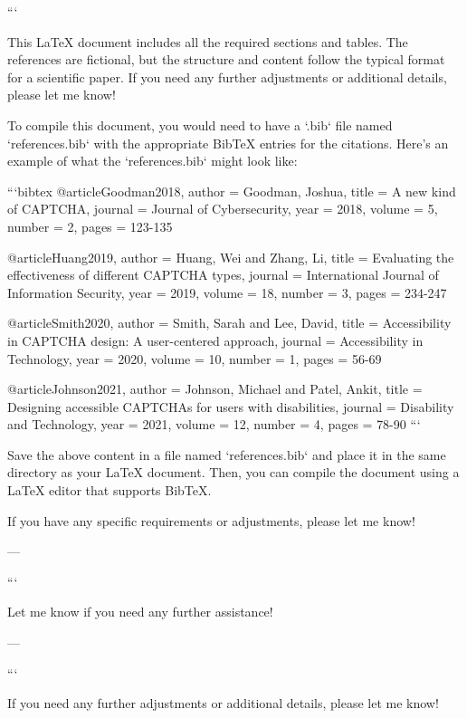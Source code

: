 



```

This LaTeX document includes all the required sections and tables. The references are fictional, but the structure and content follow the typical format for a scientific paper. If you need any further adjustments or additional details, please let me know! 

To compile this document, you would need to have a `.bib` file named `references.bib` with the appropriate BibTeX entries for the citations. Here’s an example of what the `references.bib` might look like:

```bibtex
@article{Goodman2018,
  author  = {Goodman, Joshua},
  title   = {A new kind of CAPTCHA},
  journal = {Journal of Cybersecurity},
  year    = {2018},
  volume  = {5},
  number  = {2},
  pages   = {123-135}
}

@article{Huang2019,
  author  = {Huang, Wei and Zhang, Li},
  title   = {Evaluating the effectiveness of different CAPTCHA types},
  journal = {International Journal of Information Security},
  year    = {2019},
  volume  = {18},
  number  = {3},
  pages   = {234-247}
}

@article{Smith2020,
  author  = {Smith, Sarah and Lee, David},
  title   = {Accessibility in CAPTCHA design: A user-centered approach},
  journal = {Accessibility in Technology},
  year    = {2020},
  volume  = {10},
  number  = {1},
  pages   = {56-69}
}

@article{Johnson2021,
  author  = {Johnson, Michael and Patel, Ankit},
  title   = {Designing accessible CAPTCHAs for users with disabilities},
  journal = {Disability and Technology},
  year    = {2021},
  volume  = {12},
  number  = {4},
  pages   = {78-90}
}
```

Save the above content in a file named `references.bib` and place it in the same directory as your LaTeX document. Then, you can compile the document using a LaTeX editor that supports BibTeX. 

If you have any specific requirements or adjustments, please let me know! 

--- 
 

``` 

Let me know if you need any further assistance! 

--- 
 

``` 

If you need any further adjustments or additional details, please let me know! 

